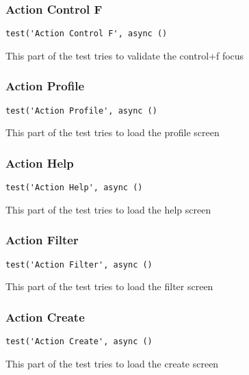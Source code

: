 \documentclass[a4paper]{article}
\begin{document}
\hypertarget{toc575}{}
\subsubsection{Action Control F}

\begin{lstlisting}
test('Action Control F', async ()
\end{lstlisting}

This part of the test tries to validate the control+f focus

\hypertarget{toc576}{}
\subsubsection{Action Profile}

\begin{lstlisting}
test('Action Profile', async ()
\end{lstlisting}

This part of the test tries to load the profile screen

\hypertarget{toc577}{}
\subsubsection{Action Help}

\begin{lstlisting}
test('Action Help', async ()
\end{lstlisting}

This part of the test tries to load the help screen

\hypertarget{toc578}{}
\subsubsection{Action Filter}

\begin{lstlisting}
test('Action Filter', async ()
\end{lstlisting}

This part of the test tries to load the filter screen

\hypertarget{toc579}{}
\subsubsection{Action Create}

\begin{lstlisting}
test('Action Create', async ()
\end{lstlisting}

This part of the test tries to load the create screen
\end{document}
